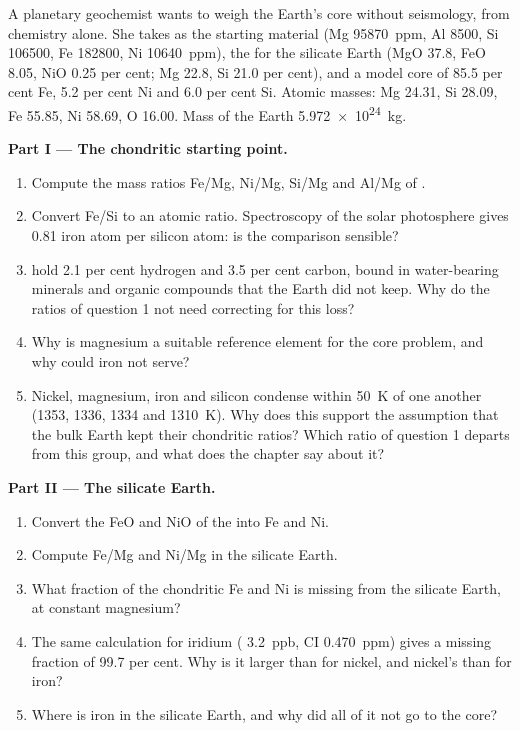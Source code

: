 \begin{problem}
\label{pb:b2:elements-in-the-earth:1}
A planetary geochemist wants to weigh the Earth's core without seismology, from
chemistry alone. She takes  as the starting material (Mg
\qty{95870}{ppm}, Al 8500, Si \num{106500}, Fe \num{182800}, Ni
\qty{10640}{ppm}), the  for the silicate Earth (MgO 37.8, FeO
8.05, NiO 0.25 per cent; Mg 22.8, Si 21.0 per cent), and a model core of 85.5
per cent Fe, 5.2 per cent Ni and 6.0 per cent Si. Atomic masses: Mg 24.31,
Si 28.09, Fe 55.85, Ni 58.69, O 16.00. Mass of the Earth
\qty{5.972e24}{kg}.

\medskip\noindent\textbf{Part I --- The chondritic starting point.}
\begin{enumerate}
\item Compute the mass ratios Fe/Mg, Ni/Mg, Si/Mg and Al/Mg of .
\item Convert Fe/Si to an atomic ratio. Spectroscopy of the solar photosphere
gives 0.81 iron atom per silicon atom: is the comparison sensible?
\item {} hold 2.1 per cent hydrogen and 3.5 per cent carbon, bound in
water-bearing minerals and organic compounds that the Earth did not keep. Why
do the ratios of question 1 not need correcting for this loss?
\item Why is magnesium a suitable reference element for the core problem, and
why could iron not serve?
\item Nickel, magnesium, iron and silicon condense within \qty{50}{K} of one
another (1353, 1336, 1334 and \qty{1310}{K}). Why does this support the
assumption that the bulk Earth kept their chondritic ratios? Which ratio of
question 1 departs from this group, and what does the chapter say about it?
\end{enumerate}

\noindent\textbf{Part II --- The silicate Earth.}
\begin{enumerate}[resume]
\item Convert the FeO and NiO of the  into Fe and Ni.
\item Compute Fe/Mg and Ni/Mg in the silicate Earth.
\item What fraction of the chondritic Fe and Ni is missing from the silicate
Earth, at constant magnesium?
\item The same calculation for iridium ( \qty{3.2}{ppb}, CI
\qty{0.470}{ppm}) gives a missing fraction of 99.7 per cent. Why is it larger
than for nickel, and nickel's than for iron?
\item Where is iron in the silicate Earth, and why did all of it not go to the
core?
\end{enumerate}


\end{problem}
